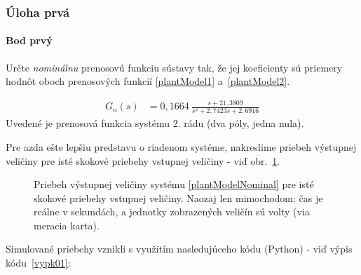 \documentclass[a4paper, 10pt, ]{article}
\begin{document}
\subsubsection{Úloha prvá}


\paragraph{Bod prvý}


\smallskip

{\color{gray}

Určte \emph{nominálnu} prenosovú funkciu sústavy tak, že jej koeficienty sú priemery hodnôt oboch prenosových funkcií \eqref{plantModel1} a~\eqref{plantModel2}.

}

\smallskip


\begin{align}
    G_{n}(s) &= 0,1664 \  \frac{s + 21,3809}{ s^2 + 2,7423 s + 2,6916} \label{plantModelNominal}
\end{align}
Uvedené je prenosová funkcia systému 2. rádu (dva póly, jedna nula).


Pre azda ešte lepšiu predstavu o riadenom systéme, nakreslime priebeh výstupnej veličiny pre isté skokové priebehy vstupnej veličiny - viď obr.~\ref{figsc_ar06_MRC_lenRS_1}.



\begin{figure}[!ht]
	\centering


	\caption{Priebeh výstupnej veličiny systému \eqref{plantModelNominal} pre isté skokové priebehy vstupnej veličiny. Naozaj len mimochodom: čas je reálne v sekundách, a jednotky zobrazených veličín sú volty (via meracia karta).}
	\label{figsc_ar06_MRC_lenRS_1}

\end{figure}



Simulované priebehy vznikli s využitím nasledujúceho kódu (Python) - viď výpis kódu~\ref{vypk01}:
\end{document}

